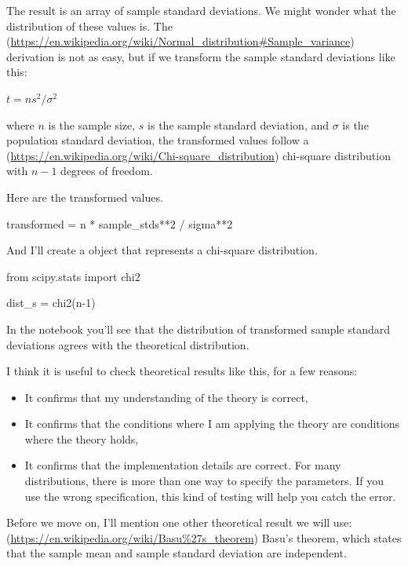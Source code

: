 \documentclass[12pt]{book}
\theoremstyle{exercise}
\begin{document}
The result is an array of sample standard deviations. We might wonder
what the distribution of these values is. The
(\url{https://en.wikipedia.org/wiki/Normal_distribution\#Sample_variance}) derivation
is not as easy, but if we transform the sample standard deviations like
this:

$t = n s^2 / \sigma^2$

where $n$ is the sample size, $s$ is the sample standard deviation,
and $\sigma$ is the population standard deviation, the transformed
values follow a
(\url{https://en.wikipedia.org/wiki/Chi-square_distribution}) chi-square
distribution with $n-1$ degrees of freedom.

Here are the transformed values.

\begin{code}
transformed = n * sample_stds**2 / sigma**2
\end{code}

And I'll create a  object that represents
a chi-square distribution.

\begin{code}
from scipy.stats import chi2

dist_s = chi2(n-1)
\end{code}

In the notebook you'll see that the distribution of transformed sample standard deviations agrees with
the theoretical distribution.

I think it is useful to check theoretical results like this, for a few
reasons:

\begin{itemize}
\item
  It confirms that my understanding of the theory is correct,

\item
  It confirms that the conditions where I am applying the theory are
  conditions where the theory holds,

\item
  It confirms that the implementation details are correct. For many
  distributions, there is more than one way to specify the parameters.
  If you use the wrong specification, this kind of testing will help you
  catch the error.
\end{itemize}

Before we move on, I'll mention one other theoretical result we will
use: (\url{https://en.wikipedia.org/wiki/Basu\%27s_theorem})
Basu's theorem, which states that the sample mean and sample standard
deviation are independent.
\end{document}

